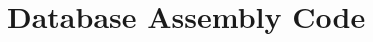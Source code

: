 \documentclass[main.tex]{subfiles}
\begin{document}
	\chapter{Database Assembly Code}\label{ch:csv}
	
\end{document}
